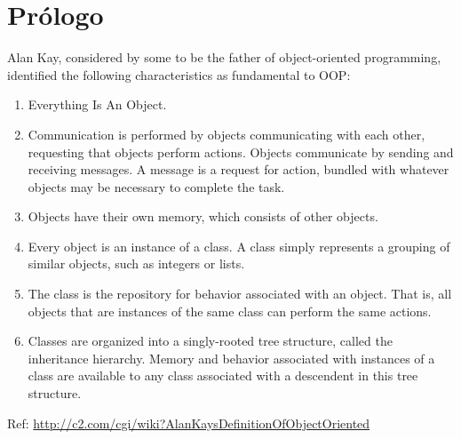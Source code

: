 \section{Pr\'ologo}

Alan Kay, considered by some to be the father of object-oriented programming, identified the following characteristics as fundamental to OOP:

\begin{enumerate}

\item Everything Is An Object.
\item Communication is performed by objects communicating with each other, requesting that objects perform actions. Objects communicate by sending and receiving messages. A message is a request for action, bundled with whatever objects may be necessary to complete the task.
\item Objects have their own memory, which consists of other objects.
\item Every object is an instance of a class. A class simply represents a grouping of similar objects, such as integers or lists.
\item The class is the repository for behavior associated with an object. That is, all objects that are instances of the same class can perform the same actions.
\item Classes are organized into a singly-rooted tree structure, called the inheritance hierarchy. Memory and behavior associated with instances of a class are available to any class associated with a descendent in this tree structure.
 
\end{enumerate}

Ref: \url{http://c2.com/cgi/wiki?AlanKaysDefinitionOfObjectOriented}